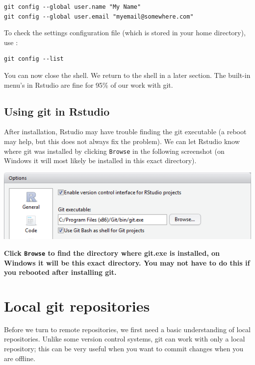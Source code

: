 \documentclass[]{book}
\begin{document}
\begin{verbatim}
git config --global user.name "My Name"
git config --global user.email "myemail@somewhere.com"
\end{verbatim}

To check the settings configuration file (which is stored in your home directory), use :

\begin{verbatim}
git config --list
\end{verbatim}

You can now close the shell. We return to the shell in a later section. The built-in menu's in Rstudio are fine for 95\% of our work with git.

\hypertarget{using-git-in-rstudio}{%
\subsection{Using git in Rstudio}\label{using-git-in-rstudio}}

After installation, Rstudio may have trouble finding the git executable (a reboot may help, but this does not always fix the problem). We can let Rstudio know where git was installed by clicking \texttt{Browse} in the following screenshot (on Windows it will most likely be installed in this exact directory).

\includegraphics[width=0.75\linewidth]{screenshots/gitoptionsrstudio}

\textbf{Click \texttt{Browse} to find the directory where git.exe is installed, on Windows it will be this exact directory. You may not have to do this if you rebooted after installing git.}

\hypertarget{localgit}{%
\section{Local git repositories}\label{localgit}}

Before we turn to remote repositories, we first need a basic understanding of local repositories. Unlike some version control systems, git can work with only a local repository; this can be very useful when you want to commit changes when you are offline.
\end{document}
